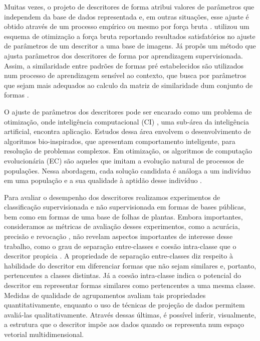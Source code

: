 Muitas vezes, o projeto de descritores de forma atribui valores de parâmetros que independem da base de dados representada e, em outras situações, esse ajuste é obtido através de um processo empírico ou mesmo por força bruta \cite{mokhtarian1998robust, Ling:2007:SCU:1191552.1191806, Wang2012134}.  utilizou um esquema de otimização a força bruta reportando resultados satisfatórios no ajuste de parâmetros de um descritor a uma base de imagens. Já  propôs um método que ajusta parâmetros dos descritores de forma por aprendizagem supervisionada. Assim, a similaridade entre padrões de formas pré estabelecidos são utilizados num processo de aprendizagem sensível ao contexto, que busca por parâmetros que sejam mais adequados ao calculo da matriz de similaridade dum conjunto de formas \cite{4815272}.

O ajuste de parâmetros dos descritores pode ser encarado como um problema de otimização, onde inteligência computacional (CI) \cite{Andries:2007}, uma sub-área da inteligência artificial, encontra aplicação. Estudos dessa área envolvem o desenvolvimento de algoritmos bio-inspirados, que apresentam comportamento inteligente, para resolução de problemas complexos. Em otimização, os algoritmos de computação evolucionária (EC)  são aqueles que imitam a evolução natural de processos de populações. Nessa abordagem, cada solução candidata é análoga a um indivíduo em uma população e a sua qualidade à aptidão desse indivíduo \cite{Eiben:2015}.

Para avaliar o desempenho dos descritores realizamos experimentos de classificação supervisionada e não supervisionada em formas de bases públicas, bem como em formas de uma base de folhas de plantas. Embora importantes, consideramos as métricas de avaliação desses experimentos, como a acurácia, precisão e revocação  \cite{Ting:2010}, não revelam aspectos importantes de interesse desse trabalho, como o grau de separação entre-classes e coesão intra-classe que o descritor propicia \cite{Meta:2009}. A propriedade de separação entre-classes diz respeito à habilidade do descritor em diferenciar formas que não sejam similares e, portanto, pertencentes a classes distintas. Já a coesão intra-classe indica o potencial do descritor em representar formas similares como pertencentes a uma mesma classe.  Medidas de qualidade de agrupamentos \cite{Meta:2009} avaliam tais propriedades quantitativamente, enquanto o uso de técnicas de projeção de dados \cite{Amorim201535} permitem avaliá-las qualitativamente. Através dessas últimas, é possível inferir, visualmente, a estrutura que o descritor impõe aos dados quando os representa num espaço vetorial multidimensional. 

